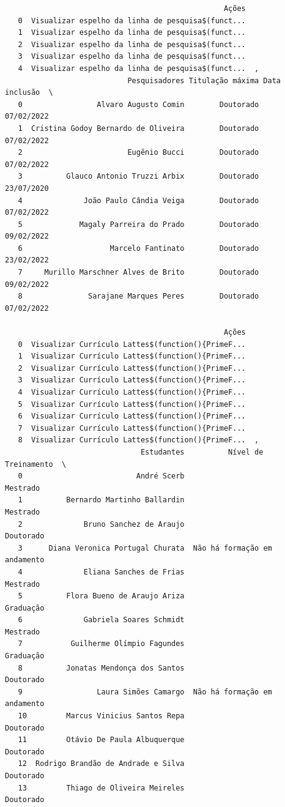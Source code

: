 \documentclass[
  brazilian,
  letterpaper,
  DIV=11,
  numbers=noendperiod]{scrartcl}
\begin{document}
\begin{verbatim}
                                                  Ações  
   0  Visualizar espelho da linha de pesquisa$(funct...  
   1  Visualizar espelho da linha de pesquisa$(funct...  
   2  Visualizar espelho da linha de pesquisa$(funct...  
   3  Visualizar espelho da linha de pesquisa$(funct...  
   4  Visualizar espelho da linha de pesquisa$(funct...  ,
                            Pesquisadores Titulação máxima Data inclusão  \
   0                 Alvaro Augusto Comin        Doutorado    07/02/2022   
   1  Cristina Godoy Bernardo de Oliveira        Doutorado    07/02/2022   
   2                        Eugênio Bucci        Doutorado    07/02/2022   
   3          Glauco Antonio Truzzi Arbix        Doutorado    23/07/2020   
   4              João Paulo Cândia Veiga        Doutorado    07/02/2022   
   5             Magaly Parreira do Prado        Doutorado    09/02/2022   
   6                    Marcelo Fantinato        Doutorado    23/02/2022   
   7     Murillo Marschner Alves de Brito        Doutorado    09/02/2022   
   8               Sarajane Marques Peres        Doutorado    07/02/2022   
   
                                                  Ações  
   0  Visualizar Currículo Lattes$(function(){PrimeF...  
   1  Visualizar Currículo Lattes$(function(){PrimeF...  
   2  Visualizar Currículo Lattes$(function(){PrimeF...  
   3  Visualizar Currículo Lattes$(function(){PrimeF...  
   4  Visualizar Currículo Lattes$(function(){PrimeF...  
   5  Visualizar Currículo Lattes$(function(){PrimeF...  
   6  Visualizar Currículo Lattes$(function(){PrimeF...  
   7  Visualizar Currículo Lattes$(function(){PrimeF...  
   8  Visualizar Currículo Lattes$(function(){PrimeF...  ,
                               Estudantes          Nível de Treinamento  \
   0                          André Scerb                      Mestrado   
   1          Bernardo Martinho Ballardin                      Mestrado   
   2              Bruno Sanchez de Araujo                     Doutorado   
   3      Diana Veronica Portugal Churata  Não há formação em andamento   
   4              Eliana Sanches de Frias                      Mestrado   
   5          Flora Bueno de Araujo Ariza                     Graduação   
   6              Gabriela Soares Schmidt                      Mestrado   
   7           Guilherme Olímpio Fagundes                     Graduação   
   8          Jonatas Mendonça dos Santos                     Doutorado   
   9                 Laura Simões Camargo  Não há formação em andamento   
   10         Marcus Vinicius Santos Repa                     Doutorado   
   11         Otávio De Paula Albuquerque                     Doutorado   
   12  Rodrigo Brandão de Andrade e Silva                     Doutorado   
   13         Thiago de Oliveira Meireles                     Doutorado   
   

\end{verbatim}
\end{document}
